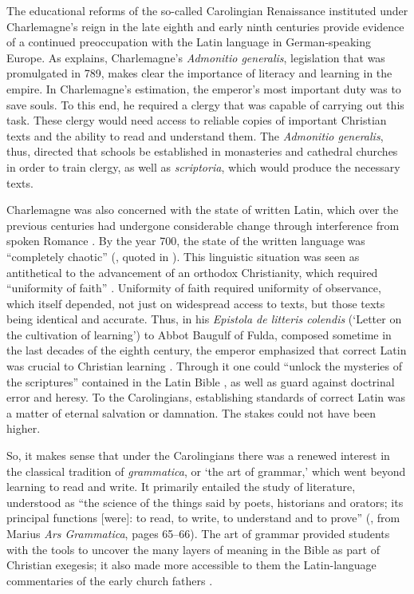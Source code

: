 The educational reforms of the so-called Carolingian Renaissance instituted under Charlemagne’s reign in the late eighth and early ninth centuries provide evidence of a continued preoccupation with the Latin language in German\hyp speaking Europe. As \citet[17--19]{Brown1994} explains, Charlemagne’s \textit{Admonitio generalis}, legislation that was promulgated in 789, makes clear the importance of literacy and learning in the empire. In Charlemagne’s estimation, the emperor’s most important duty was to save souls. To this end, he required a clergy that was capable of carrying out this task. These clergy would need access to reliable copies of important Christian texts and the ability to read and understand them. The \textit{Admonitio generalis}, thus, directed that schools be established in monasteries and cathedral churches in order to train clergy, as well as \textit{scriptoria}, which would produce the necessary texts.

Charlemagne was also concerned with the state of written Latin, which over the previous centuries had undergone considerable change through interference from spoken Romance \citep[162--163]{Zeller2021}. By the year 700, the state of the written language was “completely chaotic” (\citealt[31]{Norberg1968}, quoted in \citealt[166]{Zeller2021}). This linguistic situation was seen as antithetical to the advancement of an orthodox Christianity, which required “uniformity of faith” \citep[20]{Brown1994}. Uniformity of faith required uniformity of observance, which itself depended, not just on widespread access to texts, but those texts being identical and accurate. Thus, in his \textit{Epistola de litteris colendis} (‘Letter on the cultivation of learning’) to Abbot Baugulf of Fulda, composed sometime in the last decades of the eighth century, the emperor emphasized that correct Latin was crucial to Christian learning \citep[20--21]{Brown1994}. Through it one could “unlock the mysteries of the scriptures” contained in the Latin Bible \citep[20]{Brown1994}, as well as guard against doctrinal error and heresy. To the Carolingians, establishing standards of correct Latin was a matter of eternal salvation or damnation. The stakes could not have been higher.

So, it makes sense that under the Carolingians there was a renewed interest in the classical tradition of \textit{grammatica}, or ‘the art of grammar,’ which went beyond learning to read and write. It primarily entailed the study of literature, understood as “the science of the things said by poets, historians and orators; its principal functions [were]: to read, to write, to understand and to prove” (\citealt[37]{Brown1994}, from Marius  \textit{Ars Grammatica}, pages 65--66). The art of grammar provided students with the tools to uncover the many layers of meaning in the Bible as part of Christian exegesis; it also made more accessible to them the Latin-language commentaries of the early church fathers \citep[37]{Brown1994}.

